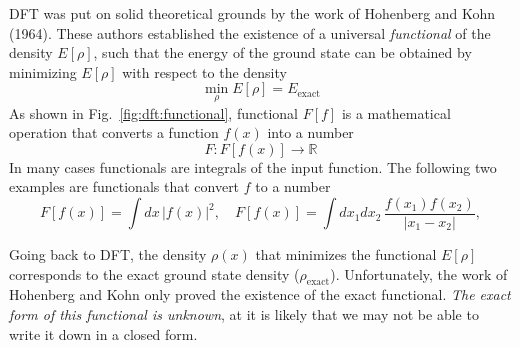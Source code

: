 \documentclass[../Main/notes.tex]{subfiles}
\begin{document}
DFT was put on solid theoretical grounds by the work of Hohenberg and Kohn (1964).
These authors established the existence of a universal \emph{functional} of the density $E[\rho]$, such that the energy of the ground state can be obtained by minimizing $E[\rho]$ with respect to the density
\begin{equation}
\min_\rho E[\rho] = E_\mathrm{exact}
\end{equation}
As shown in Fig.~\ref{fig:dft:functional}, functional $F[f]$ is a mathematical operation that converts a function $f(x)$ into a number
\begin{equation}
F : F[f(x)] \rightarrow \mathbb{R}
\end{equation}
In many cases functionals are integrals of the input function.
The following two examples are functionals that convert $f$ to a number
\begin{equation}
F[f(x)] = \int dx \, |f(x)|^2,\quad F[f(x)] = \int dx_1 dx_2 \, \frac{f(x_1) f(x_2)}{|x_1 - x_2|},
\end{equation}

Going back to DFT, the density $\rho(x)$ that minimizes the functional $E[\rho]$ corresponds to the exact ground state density ($\rho_\mathrm{exact}$).
Unfortunately, the work of Hohenberg and Kohn only proved the existence of the exact functional.
\emph{The exact form of this functional is unknown}, at it is likely that we may not be able to write it down in a closed form.
\end{document}
